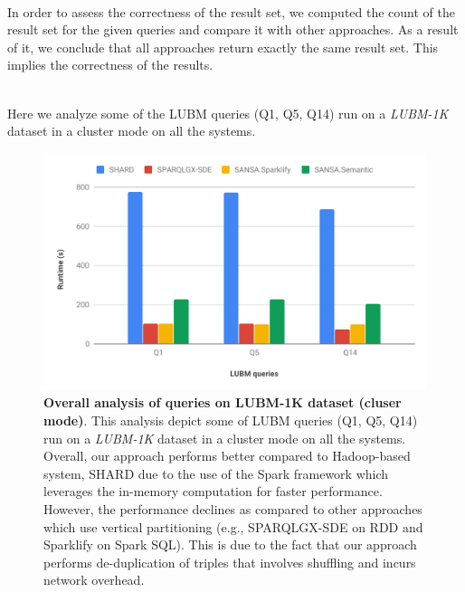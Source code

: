 ~\\ 
In order to assess the correctness of the result set, we computed the count of the result set for the given queries and compare it with other approaches.
As a result of it, we conclude that all approaches return exactly the same result set.
This implies the correctness of the results.

~\\ 
Here we analyze some of the LUBM queries (Q1, Q5, Q14) run on a \textit{LUBM-1K} dataset in a cluster mode on all the systems.

\begin{figure}
   \includegraphics[width=1.0\columnwidth]{images/6_scalable_rdf_querying/semantic-based-overall-analysis.pdf}
    \caption{\textbf{Overall analysis of queries on LUBM-1K dataset (cluser mode)}.
    This analysis depict some of LUBM queries (Q1, Q5, Q14) run on a \textit{LUBM-1K} dataset in a cluster mode on all the systems. 
    Overall, our approach performs better compared to Hadoop-based system, SHARD due to the use of the Spark framework which leverages the in-memory computation for faster performance.
    However, the performance declines as compared to other approaches which use vertical partitioning (e.g., SPARQLGX-SDE on RDD and Sparklify on Spark SQL).
    This is due to the fact that our approach performs de-duplication of triples that involves shuffling and incurs network overhead.
    }
    \label{fig:semantic-based-overall-analysis}
\end{figure}

